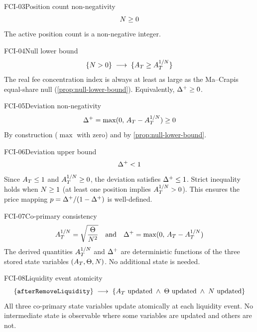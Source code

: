 \begin{invariant}{FCI-03}{Position count non-negativity}
\[
  N \geq 0
\]
The active position count is a non-negative integer.
\end{invariant}

\begin{invariant}{FCI-04}{Null lower bound}
\[
  \{N > 0\} \;\longrightarrow\; \{A_T \geq A_T^{1/N}\}
\]
The real fee concentration index is always at least as large as the Ma--Crapis
equal-share null (\cref{prop:null-lower-bound}). Equivalently, $\Delta^{+} \geq 0$.
\end{invariant}

\begin{invariant}{FCI-05}{Deviation non-negativity}
\[
  \Delta^{+} = \max(0,\, A_T - A_T^{1/N}) \geq 0
\]
By construction ($\max$ with zero) and by \cref{prop:null-lower-bound}.
\end{invariant}

\begin{invariant}{FCI-06}{Deviation upper bound}
\[
  \Delta^{+} < 1
\]
Since $A_T \leq 1$ and $A_T^{1/N} \geq 0$, the deviation satisfies $\Delta^{+} \leq 1$.
Strict inequality holds when $N \geq 1$ (at least one position implies $A_T^{1/N} > 0$).
This ensures the price mapping $p = \Delta^{+}/(1-\Delta^{+})$ is well-defined.
\end{invariant}

\begin{invariant}{FCI-07}{Co-primary consistency}
\[
  A_T^{1/N} = \sqrt{\frac{\Theta}{N^2}}
  \quad\text{and}\quad
  \Delta^{+} = \max(0,\, A_T - A_T^{1/N})
\]
The derived quantities $A_T^{1/N}$ and $\Delta^{+}$ are deterministic functions of
the three stored state variables $(A_T, \Theta, N)$.
No additional state is needed.
\end{invariant}

\begin{invariant}{FCI-08}{Liquidity event atomicity}
\[
  \{\texttt{afterRemoveLiquidity}\}
  \;\longrightarrow\;
  \{A_T \text{ updated} \;\land\; \Theta \text{ updated} \;\land\; N \text{ updated}\}
\]
All three co-primary state variables update atomically at each liquidity event.
No intermediate state is observable where some variables are updated and others are not.
\end{invariant}

